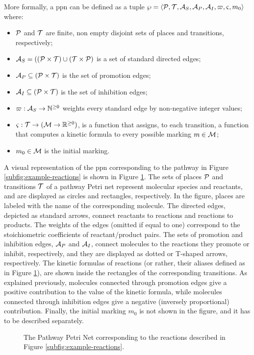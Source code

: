 More formally, a \gls{ppn} can be defined as a tuple $\wp = \Tuple{\Cal{P},\Cal{T},\Cal{A}_{S}, \Cal{A}_{P},\Cal{A}_{I},\varpi,\varsigma,m_0}$ where:
\begin{itemize}
    \item $\Cal{P}$ and $\Cal{T}$ are finite, non empty disjoint sets of places and transitions, respectively;
    \item $\Cal{A}_{S} = ((\Cal{P}\times \Cal{T}) \cup (\Cal{T}\times \Cal{P})$ is a set of standard directed edges;
    \item $\Cal{A}_{P} \subseteq (\Cal{P} \times \Cal{T})$ is the set of promotion edges;
    \item $\Cal{A}_{I} \subseteq (\Cal{P} \times \Cal{T})$ is the set of inhibition edges;
    \item $\varpi: \Cal{A}_{S} \shortrightarrow \Natural^{\geq 0}$ weights every standard edge by non-negative integer values;
    \item $\varsigma:\Cal{T} \shortrightarrow (\Cal{M} \rightarrow \Real^{\geq 0})$,  is a function that assigns, to each transition, a function that computes a kinetic formula to every possible marking $m \in \Cal{M}$;
    \item $m_0 \in \Cal{M}$ is the initial marking.
\end{itemize}
A visual representation of the \gls{ppn} corresponding to the pathway in Figure \ref{subfig:example-reactions} is shown in Figure \ref{subfig:pathway-petri-net}. The sets of places $\Cal{P}$ and transitions $\Cal{T}$ of a pathway Petri net represent molecular species and reactants, and are displayed as circles and rectangles, respectively. In the figure, places are labeled with the name of the corresponding molecule. The directed edges, depicted as standard arrows, connect reactants to reactions and reactions to products. The weights of the edges (omitted if equal to one) correspond to the stoichiometric coefficients of reactant/product pairs. The sets of promotion and inhibition edges, $\Cal{A}_{P}$ and $\Cal{A}_{I}$, connect molecules to the reactions they promote or inhibit, respectively, and they are displayed as dotted or T-shaped arrows, respectively. The kinetic formulas of reactions (or rather, their aliases defined as in Figure \ref{subfig:pathway-petri-net}), are shown inside the rectangles of the corresponding transitions. As explained previously, molecules connected through promotion edges give a positive contribution to the value of the kinetic formula, while molecules connected through inhibition edges give a negative (inversely proportional) contribution. Finally, the initial marking $m_0$ is not shown in the figure, and it has to be described separately.
\begin{figure}[h!]
    \centering
    \resizebox{.6\textwidth}{!}{}
    \caption{The Pathway Petri Net corresponding to the reactions described in Figure \ref{subfig:example-reactions}.}
    \label{subfig:pathway-petri-net}
\end{figure}

